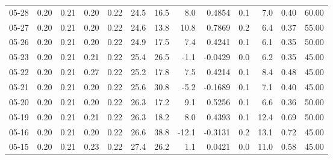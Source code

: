 \begin{threeparttable}
{\begin{tabular}{lrrrrrrrrrrrr}
  05-28 &          0.20 &          0.21 &          0.20 &        0.22 &                24.5 &                16.5 &        8.0 &       0.4854 &                 0.1 &              7.0 &            0.40 &                  60.00 \\
  05-27 &          0.20 &          0.21 &          0.20 &        0.22 &                24.6 &                13.8 &       10.8 &       0.7869 &                 0.2 &              6.4 &            0.37 &                  55.00 \\
  05-26 &          0.20 &          0.21 &          0.20 &        0.22 &                24.9 &                17.5 &        7.4 &       0.4241 &                 0.1 &              6.1 &            0.35 &                  50.00 \\
  05-23 &          0.20 &          0.21 &          0.21 &        0.22 &                25.4 &                26.5 &       -1.1 &      -0.0429 &                 0.0 &              6.2 &            0.35 &                  45.00 \\
  05-22 &          0.20 &          0.21 &          0.27 &        0.22 &                25.2 &                17.8 &        7.5 &       0.4214 &                 0.1 &              8.4 &            0.48 &                  45.00 \\
  05-21 &          0.20 &          0.21 &          0.20 &        0.22 &                25.6 &                30.8 &       -5.2 &      -0.1689 &                 0.1 &              7.1 &            0.40 &                  45.00 \\
  05-20 &          0.20 &          0.21 &          0.20 &        0.22 &                26.3 &                17.2 &        9.1 &       0.5256 &                 0.1 &              6.6 &            0.36 &                  50.00 \\
  05-19 &          0.20 &          0.21 &          0.21 &        0.22 &                26.3 &                18.2 &        8.0 &       0.4393 &                 0.1 &             12.4 &            0.69 &                  50.00 \\
  05-16 &          0.20 &          0.21 &          0.20 &        0.22 &                26.6 &                38.8 &      -12.1 &      -0.3131 &                 0.2 &             13.1 &            0.72 &                  45.00 \\
  05-15 &          0.20 &          0.21 &          0.23 &        0.22 &                27.4 &                26.2 &        1.1 &       0.0421 &                 0.0 &             11.0 &            0.58 &                  45.00 \\

\end{tabular}}
\end{threeparttable}
